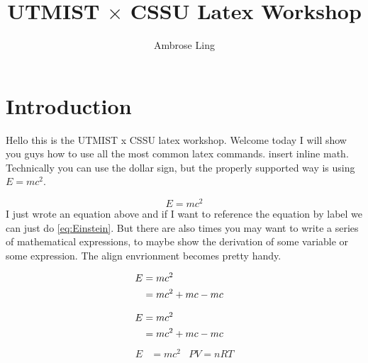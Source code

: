 \documentclass{article}
\title{UTMIST $\times$ CSSU Latex Workshop}
\author{Ambrose Ling}
\begin{document}
\maketitle

\section{Introduction}
\indent Hello this is the UTMIST x CSSU latex workshop. Welcome today I will show you guys how to use all the most common latex commands. insert inline math. \newline \indent Technically you can use the dollar sign, but the properly supported way is using \(E = mc^2\).

\begin{equation}
\label{eq:Einstein}
E = mc^2
\end{equation}
I just wrote an equation above and if I want to reference the equation by label we can just do  \ref{eq:Einstein}. But there are also times you may want to write a series of mathematical expressions, to maybe show the derivation of some variable or some expression. The align envrionment becomes pretty handy.

\begin{align}
E &= mc^2 \notag &&
\\ &= mc^2 + mc - mc &&
\end{align}

\begin{align}
E &= mc^2 \notag &&
\\ &= mc^2 + mc - mc &&
\end{align}
\begin{align}
E &= mc^2 & P V = n R T
\end{align}
\end{document}
